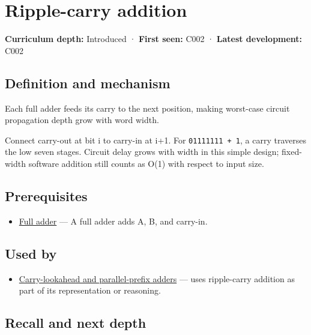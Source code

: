 \hypertarget{appendix-17917d9fdbe3}{}\label{referencestart:appendix-17917d9fdbe3}
\section{Ripple-carry addition}\label{appendix-17917d9fdbe3-ripple-carry-addition}

\textbf{Curriculum depth:} Introduced · \textbf{First seen:} C002 · \textbf{Latest development:} C002

\subsection{Definition and mechanism}\label{appendix-17917d9fdbe3-definition-and-mechanism}

Each full adder feeds its carry to the next position, making worst-case circuit propagation depth grow with word width.

Connect carry-out at bit i to carry-in at i+1. For \texttt{01111111\ +\ 1}, a carry traverses the low seven stages. Circuit delay grows with width in this simple design; fixed-width software addition still counts as O(1) with respect to input size.

\subsection{Prerequisites}\label{appendix-17917d9fdbe3-prerequisites}

\begin{itemize}
\tightlist
\item
  \hyperref[appendix-d1a5b1e520c2]{Full adder} --- A full adder adds A, B, and carry-in.
\end{itemize}

\subsection{Used by}\label{appendix-17917d9fdbe3-used-by}

\begin{itemize}
\tightlist
\item
  \hyperref[appendix-b5c46b2d94ff]{Carry-lookahead and parallel-prefix adders} --- uses ripple-carry addition as part of its representation or reasoning.
\end{itemize}

\subsection{Recall and next depth}\label{appendix-17917d9fdbe3-recall-and-next-depth}

